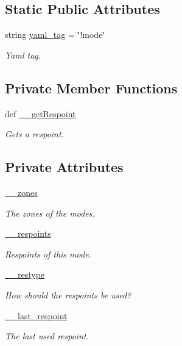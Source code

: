 \subsection*{Static Public Attributes}
\begin{DoxyCompactItemize}
\item 
string \hyperlink{class_mode_1_1_mode_ae57cf492ec773e7116974023cfec575b}{yaml\_\-tag} = \char`\"{}!mode\char`\"{}
\begin{DoxyCompactList}\small\item\em Yaml tag. \item\end{DoxyCompactList}\end{DoxyCompactItemize}
\subsection*{Private Member Functions}
\begin{DoxyCompactItemize}
\item 
def \hyperlink{class_mode_1_1_mode_af6ee8ed30365011c35b48d4c5696e05b}{\_\-\_\-getRespoint}
\begin{DoxyCompactList}\small\item\em Gets a respoint. \item\end{DoxyCompactList}\end{DoxyCompactItemize}
\subsection*{Private Attributes}
\begin{DoxyCompactItemize}
\item 
\hyperlink{class_mode_1_1_mode_a0672655c12a3e18e65d084c395d9378c}{\_\-\_\-zones}
\begin{DoxyCompactList}\small\item\em The zones of the modes. \item\end{DoxyCompactList}\item 
\hyperlink{class_mode_1_1_mode_a2e07ed5d08d3ced387d24587f8a87967}{\_\-\_\-respoints}
\begin{DoxyCompactList}\small\item\em Respoints of this mode. \item\end{DoxyCompactList}\item 
\hyperlink{class_mode_1_1_mode_a1fd32aea9872573e444d08b65ec28ef2}{\_\-\_\-restype}
\begin{DoxyCompactList}\small\item\em How should the respoints be used? \item\end{DoxyCompactList}\item 
\hyperlink{class_mode_1_1_mode_a93dd6d85da76655a5ca8f5a4873109f9}{\_\-\_\-last\_\-respoint}
\begin{DoxyCompactList}\small\item\em The last used respoint. \item\end{DoxyCompactList}\end{DoxyCompactItemize}
